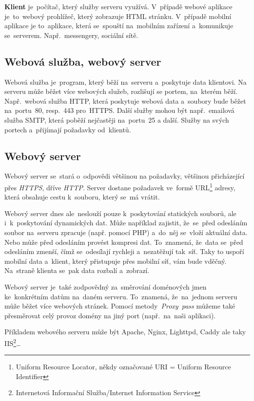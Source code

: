 \documentclass[14pt]{article}
\begin{document}
        \textbf{Klient} je~počítač, který služby serveru využívá. V~případě webové aplikace je~to~webový prohlížeč, který zobrazuje HTML stránku.
        V~případě mobilní aplikace je to~aplikace, která se~spouští na~mobilním zařízení a~komunikuje se~serverem. Např.~messengery, sociální sítě.

        \subsection{Webová služba, webový server}
        Webová služba je~program, který běží na~serveru a~poskytuje data klientovi. Na serveru může běžet více webových služeb,
        rozlišují se portem, na~kterém běží. Např.~webová služba HTTP, která poskytuje webová data a~soubory bude běžet na~portu~80,
        resp.~443 pro~HTTPS. Další služby mohou být např.~emailová služba SMTP, která poběží nejčastěji na~portu~25 a další.
        Služby  na svých portech a~přijímají požadavky od~klientů.

        \subsection{Webový server}
        Webový server se~stará o~odpovědi většinou na požadavky, většinou přicházející přes \emph{HTTPS}, dříve \emph{HTTP}.
        Server dostane požadavek ve~formě URL\footnote{Uniform Resource Locator, někdy označované URI = Uniform Resource Identifier} adresy,
        která obsahuje cestu k~souboru, který se~má vrátit.

        Webový server dnes ale~neslouží pouze k~poskytování statických souborů, ale i~k~poskytování dynamických dat.
        Může například zajistit, že~se~před odesláním soubor na~serveru zpracuje (např. pomocí PHP) a~do~něj se~vloží aktuální data.
        Nebo může před odesláním provést kompresi dat. To~znamená, že~data se~před odesláním zmenší, čímž se~odesílají rychleji a~nezatěžují
        tak~síť. Taky to uspoří mobilní data a~klient, který přistupuje přes mobilní síť, vám bude vděčný. Na~straně klienta se~pak data rozbalí a~zobrazí.

        Webový server je~také zodpovědný za~směrování doménových jmen ke~konkrétním datům na~daném serveru. To~znamená, že~na~jednom serveru může běžet více webových stránek.
        Pomocí metody~\emph{Proxy~pass} můžeme také přesměrovat celý provoz domény na jiný port (např.~na~naši aplikaci).

        Příkladem webového serveru může být Apache, Nginx, Lighttpd, Caddy ale taky IIS\footnote{Internetová Informační Služba/Internet Information Service}\dots
\end{document}
